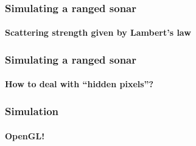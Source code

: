 \documentclass[
    beamer                                       %
  ,table,dvipsnames,svgnames
]{common/mytemplate}
\begin{document}
{
%
\begin{frame}
\frametitle{Simulating a ranged sonar}
\framesubtitle{Scattering strength given by Lambert's law}
\vspace{8cm}                                                                                                                                                                                                                                                                                               
\end{frame}
}


{
%
\begin{frame}
\frametitle{Simulating a ranged sonar}
\framesubtitle{How to deal with ``hidden pixels''?}
\vspace{8cm}                                                                                                                                                                                                                                                                                               
\end{frame}
}


{
%
\begin{frame}
\frametitle{Simulation}
\framesubtitle{OpenGL!}
\vspace{8cm}                                                                                                                                                                                                                                                                                               
\end{frame}
}




\end{document}
